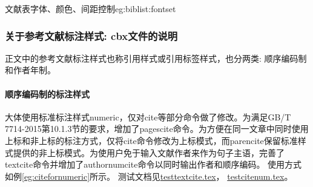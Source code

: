 \begin{example}{文献表字体、颜色、间距控制}{eg:biblist:fontset}
\begin{texlist}
%

%
\renewcommand{\bibfont}{\zihao{-5}}%
\renewcommand{\bibauthorfont}{\bfseries\color{teal}}%
\renewcommand{\bibtitlefont}{\ttfamily\color{blue}}%
\renewcommand{\bibpubfont}{\itshape\color{violet}}%
\def\UrlFont{\ttfamily} %

\setlength{\bibitemsep}{0ex}
\setlength{\bibnamesep}{0ex}
\setlength{\bibinitsep}{0ex}



\end{texlist}
\end{example}

\subsubsection{关于参考文献标注样式: cbx文件的说明}\label{sec:cbx:usage}
正文中的参考文献标注样式也称引用样式或引用标签样式，也分两类: 顺序编码制和作者年制。

\paragraph{顺序编码制的标注样式} 大体使用标准标注样式numeric，仅对cite等部分命令做了修改。为满足GB/T 7714-2015第10.1.3节的要求，增加了pagescite命令。为方便在同一文章中同时使用上标和非上标的标注方式，仅将cite命令修改为上标模式，而parencite保留标准样式提供的非上标模式。为使用户免于输入文献作者来作为句子主语，完善了textcite命令并增加了authornumcite命令以同时输出作者和顺序编码。
使用方式如例\ref{eg:citefornumeric}所示。
测试文档见\href{run:example/testtextcite.tex}{testtextcite.tex}，
\href{run:example/testcitenum.tex}{testcitenum.tex}。


